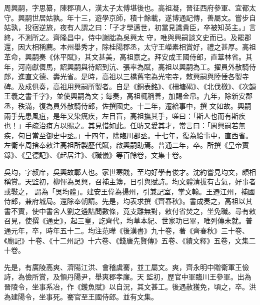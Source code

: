 \begin{pinyinscope}
 周興嗣，字思纂，陳郡項人，漢太子太傅堪後也。高祖凝，晉征西府參軍、宜都太守。興嗣世居姑孰。年十三，遊學京師，積十餘載，遂博通記傳，善屬文。嘗步自姑孰，投宿逆旅，夜有人謂之曰：「子才學邁世，初當見識貴臣，卒被知英主。」言終，不測所之。齊隆昌中，侍中謝朏為吳興太
 守，唯與興嗣談文史而已。及罷郡還，因大相稱薦。本州舉秀才，除桂陽郡丞，太守王嶸素相賞好，禮之甚厚。高祖革命，興嗣奏《休平賦》，其文甚美，高祖嘉之。拜安成王國侍郎，直華林省。其年，河南獻儛馬，詔興嗣與待詔到沆、張率為賦，高祖以興嗣為工。擢員外散騎侍郎，進直文德、壽光省。是時，高祖以三橋舊宅為光宅寺，敕興嗣與陸倕各製寺碑。及成俱奏，高祖用興嗣所製者。自是《銅表銘》、《柵塘碣》、《北伐檄》、《次韻王羲之書千字》，並使興嗣為文；每奏，高祖輒稱善，加賜金帛。九年，除新安郡丞，秩滿，復為員外散騎侍郎，佐撰國史。十二年，遷給事中，撰
 文如故。興嗣兩手先患風疽，是年又染癘疾，左目盲，高祖撫其手，嗟曰：「斯人也而有斯疾也！」手疏治疽方以賜之。其見惜如此。任昉又愛其才，常言曰：「周興嗣若無疾，旬日當至御史中丞。」十四年，除臨川郡丞。十七年，復為給事中，直西省。左衛率周捨奉敕注高祖所製歷代賦，啟興嗣助焉。普通二年，卒。所撰《皇帝實錄》、《皇德記》、《起居注》、《職儀》等百餘卷，文集十卷。



 吳均，字叔庠，吳興故鄣人也。家世寒賤，至均好學有俊才。沈約嘗見均文，頗相稱賞。天監初，柳惲為吳興，召補主簿，日引與賦詩。均文體清拔有古氣，好事者或斅之，
 謂為「吳均體」。建安王偉為揚州，引兼記室，掌文翰。王遷江州，補國侍郎，兼府城局。還除奉朝請。先是，均表求撰《齊春秋》。書成奏之，高祖以其書不實，使中書舍人劉之遴詰問數條，竟支離無對，敕付省焚之，坐免職。尋有敕召見，使撰《通史》，起三皇，訖齊代，均草本紀、世家功已畢，唯列傳未就。普通元年，卒，時年五十二。均注范曄《後漢書》九十卷，著《齊春秋》三十卷、《廟記》十卷、《十二州記》十六卷、《錢唐先賢傳》五卷、《續文釋》五卷，文集二十卷。



 先是，有廣陵高爽、濟陽江洪、會稽虞騫，並工屬文。爽，齊永明中贈衛軍王儉詩，為儉所賞，及領丹陽尹，舉爽郡孝廉。天
 監初，歷官中軍臨川王參軍。出為晉陵令，坐事系冶，作《鑊魚賦》以自況，其文甚工。後遇赦獲免，頃之，卒。洪為建陽令，坐事死。騫官至王國侍郎。並有文集。



\end{pinyinscope}